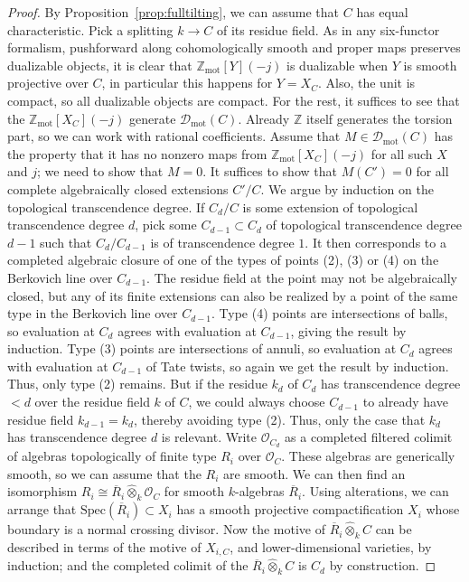 \documentclass[11pt]{amsart}
\numberwithin{equation}{section}
\numberwithin{theorem}{section}
\theoremstyle{definition}
\begin{document}
\begin{proof} By Proposition~\ref{prop:fulltilting}, we can assume that $C$ has equal characteristic. Pick a splitting $k\to C$ of its residue field. As in any six-functor formalism, pushforward along cohomologically smooth and proper maps preserves dualizable objects, it is clear that $\mathbb Z_{\mathrm{mot}}[Y](-j)$ is dualizable when $Y$ is smooth projective over $C$, in particular this happens for $Y=X_C$. Also, the unit is compact, so all dualizable objects are compact. For the rest, it suffices to see that the $\mathbb Z_{\mathrm{mot}}[X_C](-j)$ generate $\mathcal D_{\mathrm{mot}}(C)$. Already $\mathbb Z$ itself generates the torsion part, so we can work with rational coefficients. Assume that $M\in \mathcal D_{\mathrm{mot}}(C)$ has the property that it has no nonzero maps from $\mathbb Z_{\mathrm{mot}}[X_C](-j)$ for all such $X$ and $j$; we need to show that $M=0$. It suffices to show that $M(C')=0$ for all complete algebraically closed extensions $C'/C$. We argue by induction on the topological transcendence degree. If $C_d/C$ is some extension of topological transcendence degree $d$, pick some $C_{d-1}\subset C_d$ of topological transcendence degree $d-1$ such that $C_d/C_{d-1}$ is of transcendence degree $1$. It then corresponds to a completed algebraic closure of one of the types of points (2), (3) or (4) on the Berkovich line over $C_{d-1}$. The residue field at the point may not be algebraically closed, but any of its finite extensions can also be realized by a point of the same type in the Berkovich line over $C_{d-1}$. Type (4) points are intersections of balls, so evaluation at $C_d$ agrees with evaluation at $C_{d-1}$, giving the result by induction. Type (3) points are intersections of annuli, so evaluation at $C_d$ agrees with evaluation at $C_{d-1}$ of Tate twists, so again we get the result by induction. Thus, only type (2) remains. But if the residue $k_d$ of $C_d$ has transcendence degree $<d$ over the residue field $k$ of $C$, we could always choose $C_{d-1}$ to already have residue field $k_{d-1}=k_d$, thereby avoiding type (2). Thus, only the case that $k_d$ has transcendence degree $d$ is relevant. Write $\mathcal O_{C_d}$ as a completed filtered colimit of algebras topologically of finite type $R_i$ over $\mathcal O_C$. These algebras are generically smooth, so we can assume that the $R_i$ are smooth. We can then find an isomorphism $R_i\cong \overline{R}_i\hat{\otimes}_k \mathcal O_C$ for smooth $k$-algebras $\overline{R}_i$. Using alterations, we can arrange that $\mathrm{Spec}(\overline{R}_i)\subset X_i$ has a smooth projective compactification $X_i$ whose boundary is a normal crossing divisor. Now the motive of $\overline{R}_i\hat{\otimes}_k C$ can be described in terms of the motive of $X_{i,C}$, and lower-dimensional varieties, by induction; and the completed colimit of the $\overline{R}_i\hat{\otimes}_k C$ is $C_d$ by construction.
\end{proof}
\end{document}
